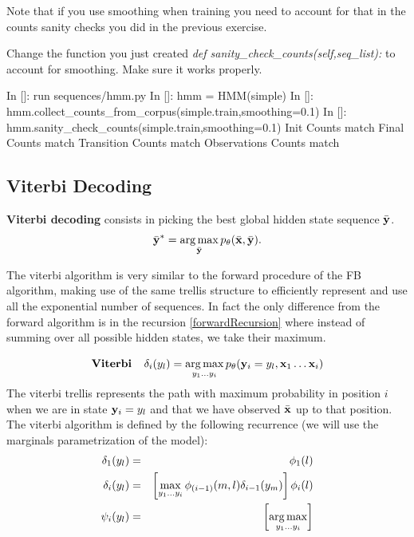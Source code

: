 Note that if you use smoothing when training you need to account for
that in the counts sanity checks you did in the previous exercise.

\begin{exercise}
Change the function you just created \emph{ def
  sanity\_check\_counts(self,seq\_list):} to account for smoothing. Make
sure it works properly.

\begin{python}
In []: run sequences/hmm.py
In []: hmm = HMM(simple)
In []: hmm.collect_counts_from_corpus(simple.train,smoothing=0.1)
In []: hmm.sanity_check_counts(simple.train,smoothing=0.1)
Init Counts match
Final Counts match
Transition Counts match
Observations Counts match
\end{python}
\end{exercise}


\subsection{Viterbi Decoding}


\textbf{Viterbi decoding} consists in
picking the best global hidden state sequence $\bar{\mathbf{y}}$. 
\begin{equation}
\bar{\mathbf{y}}^* = \operatorname*{arg\,max}_{\bar{\mathbf{y}}} p_{\theta}(\bar{\mathbf{x}} ,\bar{\mathbf{y}}).
\end{equation}

The viterbi algorithm 
is very similar to the forward procedure of the FB algorithm,
making use of the same trellis structure to efficiently represent and 
use all the exponential number of sequences. In fact the only
difference from the forward algorithm is in the recursion
\ref{forwardRecursion} where instead of summing over all possible 
hidden states, we take their maximum.

\begin{equation}
\label{eq::viterbi}
\mathbf{Viterbi }\;\;\;\;  \delta_i({y}_l) = \operatorname*{arg\,max}_{y_1...y_i} p_{\theta}(\mathbf{y}_i = {y}_l , \mathbf{x}_1 \ldots \mathbf{x}_i)
\end{equation}
The viterbi trellis represents the path with maximum probability in
position
$i$ when we are in state $\mathbf{y}_i = {y}_l$ and that we have observed $\bar{\mathbf{x}}$
up to that position. The viterbi algorithm is defined by the
following recurrence (we will use the marginals parametrization of the
model): 
\begin{eqnarray}
\delta_1({y}_l) &=& \phi_1(l) \\
\delta_i({y}_l) &=& \left[ \max_{y_1 ... y_i} \phi_{(i-1)}(m,l)
  \delta_{i-1}({y}_m) \right] \phi_i(l) \label{viterbiRecursion} \\
\psi_{i}({y}_l) &=& \left[ \operatorname*{arg\,max}_{y_1 ... y_i} \right]
\end{eqnarray}


